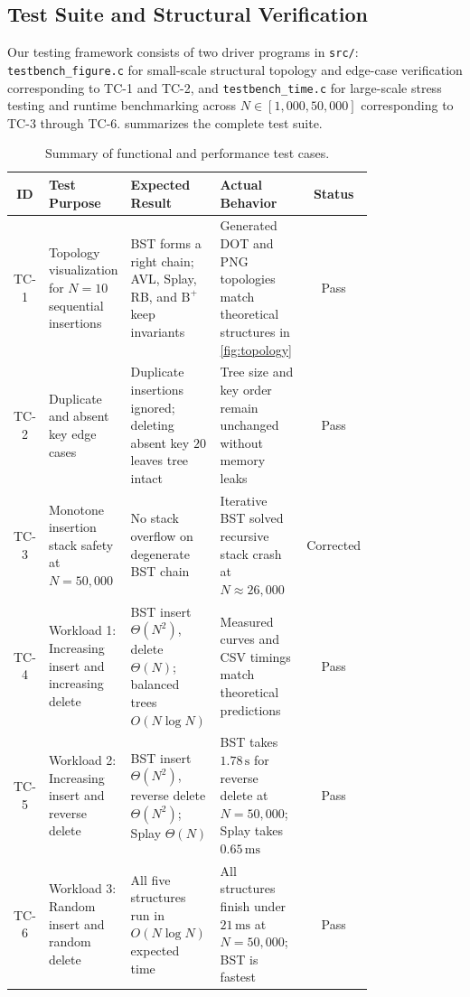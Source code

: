 \documentclass[10pt, a4paper]{article}
\newcommand{\code}[1]{\texttt{\color{primary!90!black}#1}}
\begin{document}
\subsection{Test Suite and Structural Verification}
Our testing framework consists of two driver programs in \code{src/}: \code{testbench\_figure.c} for small-scale structural topology and edge-case verification corresponding to TC-1 and TC-2, and \code{testbench\_time.c} for large-scale stress testing and runtime benchmarking across $N \in [1{,}000, 50{,}000]$ corresponding to TC-3 through TC-6.  summarizes the complete test suite.

\vspace{-0.3em}
\begin{table}[H]
\centering
\caption{Summary of functional and performance test cases.}
\label{tab:testcases}
\renewcommand{\arraystretch}{0.92}
\setlength{\tabcolsep}{4.5pt}
\begin{tabular}{@{}cp{0.22\linewidth}p{0.28\linewidth}p{0.29\linewidth}c@{}}
\toprule
\textbf{\color{primary}ID} & \textbf{\color{primary}Test Purpose} & \textbf{\color{primary}Expected Result} & \textbf{\color{primary}Actual Behavior} & \textbf{\color{primary}Status} \\
\midrule
TC-1 & Topology visualization for $N=10$ sequential insertions & BST forms a right chain; AVL, Splay, RB, and $\text{B}^+$ keep invariants & Generated DOT and PNG topologies match theoretical structures in \cref{fig:topology} & Pass \\
TC-2 & Duplicate and absent key edge cases & Duplicate insertions ignored; deleting absent key $20$ leaves tree intact & Tree size and key order remain unchanged without memory leaks & Pass \\
TC-3 & Monotone insertion stack safety at $N=50{,}000$ & No stack overflow on degenerate BST chain & Iterative BST solved recursive stack crash at $N \approx 26{,}000$ & Corrected \\
TC-4 & Workload 1: Increasing insert and increasing delete & BST insert $\Theta(N^2)$, delete $\Theta(N)$; balanced trees $O(N\log N)$ & Measured curves and CSV timings match theoretical predictions & Pass \\
TC-5 & Workload 2: Increasing insert and reverse delete & BST insert $\Theta(N^2)$, reverse delete $\Theta(N^2)$; Splay $\Theta(N)$ & BST takes $1.78\,\text{s}$ for reverse delete at $N=50{,}000$; Splay takes $0.65\,\text{ms}$ & Pass \\
TC-6 & Workload 3: Random insert and random delete & All five structures run in $O(N\log N)$ expected time & All structures finish under $21\,\text{ms}$ at $N=50{,}000$; BST is fastest & Pass \\
\bottomrule
\end{tabular}
\end{table}
\vspace{-0.6em}
\end{document}
